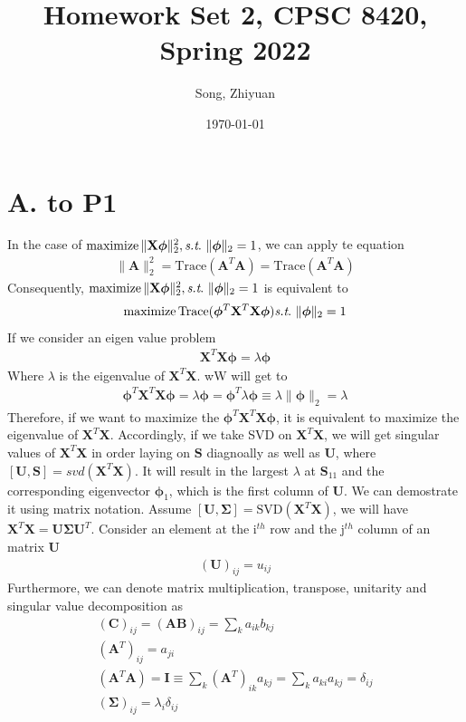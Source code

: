 \documentclass[11pt]{article}
\title{{\bf Homework Set 2, CPSC 8420, Spring 2022}} %
\author{\Large{Song, Zhiyuan}}
\date{\today}
\newcommand{\maximize}{\operatorname*{maximize}}
\newcommand{\mtx}[1]{\mathbf{#1}}
\def \mA {\mtx{A}}
\def \mI {\mtx{I}}
\def \mU {\mtx{U}}
\def \mS {\mtx{S}}
\def \mSigma {\mtx{\Sigma}}
\def \mX {\mtx{X}}
\begin{document}
	\maketitle
	\section*{A. to P1}
	In the case of $\maximize \|\mX \bm{\phi}\|^2_2, \st \ \|\bm{\phi}\|_2=1$,	we can apply te equation\\
	\begin{align}
	\|\mA\|^2_2 = \text{Trace}(\mA^{T}\mA) = \text{Trace}(\mA^T\mA)
	\end{align}
	Consequently, $\maximize \|\mX \bm{\phi}\|^2_2, \st \ \|\bm{\phi}\|_2=1$ is equivalent to
	\begin{align*}
	\maximize \text{Trace}(\bm{\phi}^T\mX^T\mX\bm{\phi}) \st \ \|\bm{\phi}\|_2=1
	\end{align*}
	If we consider an eigen value problem
	\begin{align*}
	\mX^T\mX\bm{\phi}=\lambda\bm{\phi}
	\end{align*}
	Where $\lambda$ is the eigenvalue of $\mX^T\mX$. wW will get to
	\begin{align*}
	\bm{\phi}^T\mX^T\mX\bm{\phi}=\lambda\bm{\phi}=\bm{\phi}^T\lambda\bm{\phi}\equiv\lambda\|\bm{\phi}\|_2=\lambda
	\end{align*}
	Therefore, if we want to maximize the $\bm{\phi}^T\mX^T\mX\bm{\phi}$, it is equivalent to maximize the eigenvalue of $\mX^T\mX$. Accordingly, if we take SVD on $\mX^T\mX$, we will get singular values of $\mX^T\mX$ in order laying on $\mS$ diagnoally as well as $\mU$, where $[\mU,\mS]=svd(\mX^T\mX)$. It will result in the largest $\lambda$ at $\mS_{11}$ and the corresponding eigenvector $\bm{\phi}_1$, which is the first column of $\mU$.
	We can demostrate it using matrix notation. Assume $\left[\mU,\mSigma\right]=\text{SVD}\left(\mX^T\mX\right)$, we will have $\mX^T\mX=\mU\mSigma\mU^T$. Consider an element at the i$^{th}$ row and the j$^{th}$ column of an matrix $\mU$
	\begin{align*}
	\left(\mU\right)_{ij}=u_{ij}
	\end{align*}
	Furthermore, we can denote matrix multiplication, transpose, unitarity and singular value decomposition as
	\begin{gather*}
	\left(\mtx{C}\right)_{ij}=\left(\mA\mtx{B}\right)_{ij}=\sum_{k}a_{ik}b_{kj} \\
	\left(\mA^T\right)_{ij}=a_{ji}\\
	\left(\mA^T\mA\right)=\mI\equiv\sum_{k}\left(\mA^T\right)_{ik}a_{kj}=\sum_{k}a_{ki}a_{kj}=\delta_{ij}\\
	\left(\mSigma\right)_{ij}=\lambda_{i}\delta_{ij}
	\end{gather*}
\end{document}
